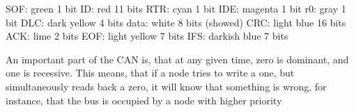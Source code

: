 
SOF: green 1 bit
ID: red 11 bits
RTR: cyan 1 bit
IDE: magenta 1 bit
r0: gray 1 bit
DLC: dark yellow 4 bits
data: white 8 bits (showed)
CRC:  light blue 16 bits
ACK: lime 2 bits
EOF: light yellow 7 bits
IFS: darkish blue 7 bits

An important part of the CAN is, that at any given time, zero is dominant, and one is recessive. 
This means, that if a node tries to write a one, but simultaneously reads back a zero, it will know that something is wrong, for instance, that the bus is occupied by a node with higher priority